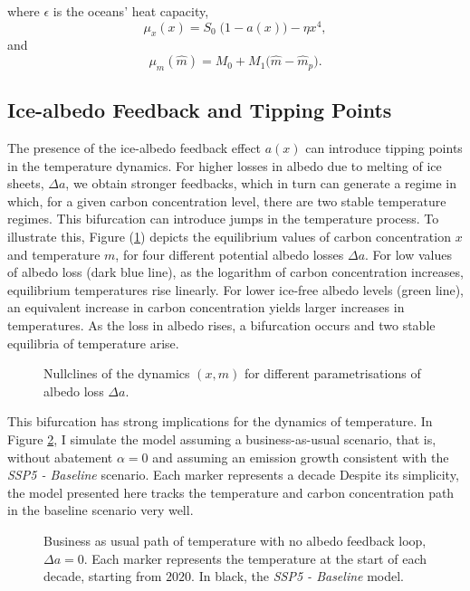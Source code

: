 \documentclass[../../main.tex]{subfiles}
\begin{document}
where $\epsilon$ is the oceans' heat capacity, \begin{equation}
    \mu_x(x) = S_0 \; \big(1 - a(x)\big) - \eta x^4,
\end{equation} and \begin{equation}
    \mu_m(\hat m) =  M_0 + M_1  \big(\hat m - \hat m_p \big).
\end{equation}

\subsection{Ice-albedo Feedback and Tipping Points}

The presence of the ice-albedo feedback effect $a(x)$ can introduce tipping points in the temperature dynamics. For higher losses in albedo due to melting of ice sheets, $\Delta a$, we obtain stronger feedbacks, which in turn can generate a regime in which, for a given carbon concentration level, there are two stable temperature regimes. This bifurcation can introduce jumps in the temperature process. To illustrate this, Figure (\ref{fig:nullclines}) depicts the equilibrium values of carbon concentration $x$ and temperature $m$, for four different potential albedo losses $\Delta a$. For low values of albedo loss (dark blue line), as the logarithm of carbon concentration increases, equilibrium temperatures rise linearly. For lower ice-free albedo levels (green line), an equivalent increase in carbon concentration yields larger increases in temperatures. As the loss in albedo rises, a bifurcation occurs and two stable equilibria of temperature arise.

\begin{figure}[H]
    \centering
    
    \caption{Nullclines of the dynamics $(x, m)$ for different parametrisations of albedo loss $\Delta a$.}
    \label{fig:nullclines}
\end{figure}

This bifurcation has strong implications for the dynamics of temperature. In Figure \ref{fig:bau:no-albedo}, I simulate the model assuming a business-as-usual scenario, that is, without abatement $\alpha = 0$ and assuming an emission growth consistent with the \textit{SSP5 - Baseline} scenario. Each marker represents a decade Despite its simplicity, the model presented here tracks the temperature and carbon concentration path in the baseline scenario very well.

\begin{figure}[H]
    \centering
    
    \caption{Business as usual path of temperature with no albedo feedback loop, $\Delta a = 0$. Each marker represents the temperature at the start of each decade, starting from $2020$. In black, the \textit{SSP5 - Baseline} model.}
    \label{fig:bau:no-albedo}
\end{figure}
\end{document}
